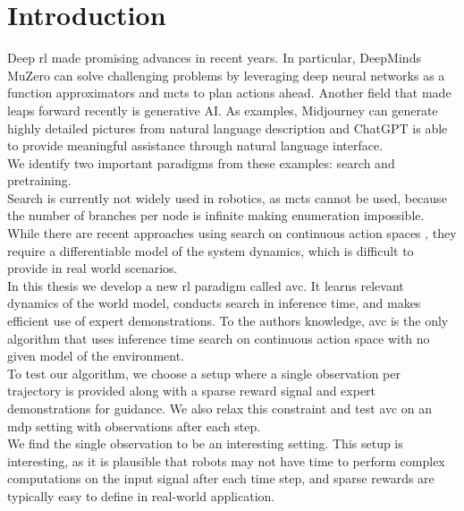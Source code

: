 \chapter{Introduction}
\label{chapter:Introduction}
Deep \ac{rl} made promising advances in recent years. In particular, DeepMinds MuZero \cite{MUZero} can solve challenging problems by leveraging deep neural networks as a function 
approximators and \ac{mcts} to plan actions ahead. 
Another field that made leaps forward recently is generative AI. As examples, Midjourney \cite{midjourney} 
can generate highly detailed pictures from natural 
language description and ChatGPT \cite{cite:ChatGPT} is able to provide meaningful assistance through natural language interface. \\

We identify two important paradigms from these examples: search and pretraining. \\

Search is currently not widely used in robotics, as \ac{mcts} cannot be used, because the number of branches per node is infinite making enumeration impossible. While there are recent approaches 
using search on continuous action spaces \cite{Manna2022} \cite{Lee_Jeon_Kim_Kim_2020}, they require a differentiable model of the system dynamics, which is difficult to provide in real world scenarios.\\ 

In this thesis we develop a new \ac{rl} 
paradigm called \ac{avc}. It learns relevant dynamics of the world model, conducts search in inference time, and makes efficient use of expert demonstrations. 
To the authors knowledge, \ac{avc} is the only algorithm that uses inference time search on continuous action space with no given model of the environment.\\
To test our algorithm, we choose a setup where a single observation per trajectory is provided along with a sparse reward signal and expert demonstrations for guidance. 
We also relax this constraint and test \ac{avc} on an \ac{mdp} setting with observations after each step.\\

We find the single observation to be an interesting setting. This setup is interesting, as it is plausible that robots may not have time to perform complex computations 
on the input signal after each time step, and sparse rewards are typically easy to define in real-world application.\\

